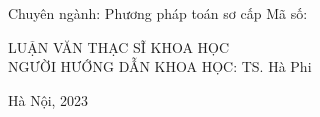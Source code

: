 \vspace{0.6cm}
\indexspace Chuyên ngành: Phương pháp toán sơ cấp
\vspace{-0.6cm}
\indexspace Mã số: \qquad \quad{}\\
\vspace{0.5cm}
\begin{center}
LUẬN VĂN THẠC SĨ KHOA HỌC
\vspace{1.5cm}
\\NGƯỜI HƯỚNG DẪN KHOA HỌC: TS. Hà Phi
\end{center}
\vspace{2.2cm}
\begin{center}
 \fontsize{14pt}{0pt}\selectfont Hà Nội, 2023
\end{center}
\cleardoublepage